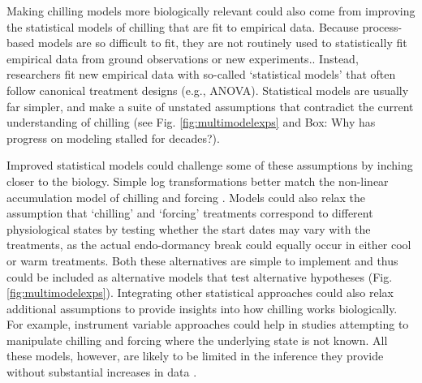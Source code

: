 \documentclass[11pt]{article}
\begin{document}

Making chilling models more biologically relevant could also come from improving the statistical models of chilling that are fit to empirical data. Because process-based models are so difficult to fit, they are not routinely used to statistically fit empirical data from ground observations or new experiments.. Instead, researchers fit new empirical data with so-called `statistical models' that often follow canonical treatment designs (e.g., ANOVA). Statistical models are usually far simpler, and make a suite of unstated assumptions that contradict the current understanding of chilling 
(see Fig. \ref{fig:multimodelexps} and Box: Why has progress on modeling stalled for decades?). %

Improved statistical models could challenge some of these assumptions by inching closer to the biology. Simple log transformations better match the non-linear accumulation model of chilling and forcing \citep{decsens}. Models could also relax the assumption that ‘chilling’ and ‘forcing’
treatments correspond to different physiological states by testing whether the start dates may vary with the treatments, as the actual endo-dormancy break could equally occur in either cool or warm treatments. 
Both these alternatives are simple to implement and thus could be included as alternative models that test alternative hypotheses (Fig. \ref{fig:multimodelexps}). 
Integrating other statistical approaches could also relax additional assumptions to provide insights into how chilling works biologically. For example, instrument variable approaches could help in studies attempting to manipulate chilling and forcing where the underlying state is not known. All these models, however, are likely to be limited in the inference they provide without substantial increases in data \citep{hanninen2019experiments}. 
\end{document}
